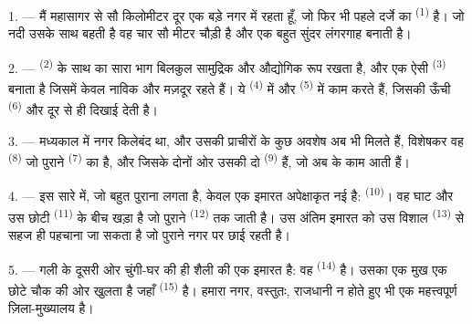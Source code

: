 
\VUsaut{2.0mm}
\VUsaut{3.0mm}
\VUfilet{16mm}
\VUsaut{5.6mm}
\VUsaut{1.4mm}
\VUsaut{2.2mm}

\VUsaut{3.0mm}

1. --- मैं महासागर से सौ किलोमीटर दूर एक बड़े नगर में रहता हूँ, जो फिर भी
पहले दर्जे का  \textsuperscript{(1)} है। जो नदी उसके साथ बहती है
वह चार सौ मीटर चौड़ी है और एक बहुत सुंदर लंगरगाह बनाती है।

2. ---  \textsuperscript{(2)} के साथ का सारा भाग बिलकुल सामुद्रिक और
औद्योगिक रूप रखता है, और एक ऐसी  \textsuperscript{(3)} बनाता
है जिसमें केवल नाविक और मज़दूर रहते हैं। ये 
\textsuperscript{(4)} में और  \textsuperscript{(5)} में काम करते हैं,
जिसकी ऊँची  \textsuperscript{(6)} और  दूर से ही
दिखाई देती है।

3. --- मध्यकाल में नगर किलेबंद था, और उसकी प्राचीरों के कुछ अवशेष अब भी मिलते
हैं, विशेषकर वह  \textsuperscript{(8)} जो पुराने
 \textsuperscript{(7)} का है, और जिसके दोनों ओर उसकी दो  \textsuperscript{(9)}
हैं, जो अब  के काम आती हैं।

4. --- इस सारे  में, जो बहुत पुराना लगता है, केवल एक इमारत
अपेक्षाकृत नई है:  \textsuperscript{(10)}। वह घाट और उस छोटी
 \textsuperscript{(11)} के बीच खड़ा है जो पुराने 
\textsuperscript{(12)} तक जाती है। उस अंतिम इमारत को उस विशाल 
\textsuperscript{(13)} से सहज ही पहचाना जा सकता है जो पुराने नगर पर छाई रहती है।

5. --- गली के दूसरी ओर चुंगी-घर की ही शैली की एक इमारत  है: वह
 \textsuperscript{(14)} है। उसका एक मुख एक छोटे चौक की ओर
खुलता है जहाँ  \textsuperscript{(15)} है। हमारा नगर, वस्तुतः,
राजधानी न होते हुए भी एक महत्त्वपूर्ण ज़िला-मुख्यालय है।

